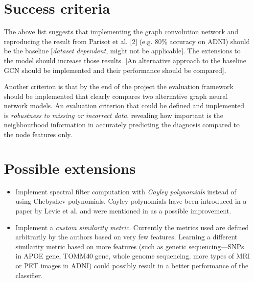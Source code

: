 \documentclass[12pt,a4paper,twoside]{article}
\begin{document}
\section*{Success criteria}




The above list suggests that implementing the graph convolution network and reproducing the result from Parisot et al. [2]\cite{parisot2018disease} (e.g. 80\% accuracy on ADNI) should be the baseline [\textit{dataset dependent}, might not be applicable]. The extensions to the model should increase those results. [An alternative approach to the baseline GCN should be implemented and their performance should be compared].

Another criterion is that by the end of the project the evaluation framework should be implemented that clearly compares two alternative graph neural network models. An evaluation criterion that could be defined and implemented is \textit{robustness to missing or incorrect data}, revealing how important is the neighbourhood information in accurately predicting the diagnosis compared to the node features only.

\section*{Possible extensions}
\begin{itemize}
  \item Implement spectral filter computation with \textit{Cayley polynomials} instead of using Chebyshev polynomials. Cayley polynomials have been introduced in a paper by Levie et al. \cite{levie2017cayleynets} and were mentioned in \cite{parisot2018disease} as a possible improvement.
  \item Implement a \textit{custom similarity metric}. Currently the metrics used are defined arbitrarily by the authors based on very few features. Learning a different similarity metric based on more features (such as genetic sequencing—SNPs in APOE gene, TOMM40 gene, whole genome sequencing, more types of MRI or PET images in ADNI) could possibly result in a better performance of the classifier.
\end{itemize}
\end{document}
